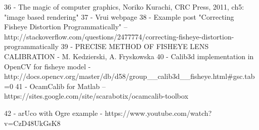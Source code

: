 36 - The magic of computer graphics, Noriko Kurachi, CRC Press, 2011, ch5: "image based rendering"
37 - Vrui webpage
38 - Example post "Correcting Fisheye Distortion Programmatically" -- http://stackoverflow.com/questions/2477774/correcting-fisheye-distortion-programmatically
39 - PRECISE METHOD OF FISHEYE LENS CALIBRATION - M. Kedzierski, A. Fryskowska
40 - Calib3d implementation in OpenCV for fisheye model - http://docs.opencv.org/master/db/d58/group__calib3d__fisheye.html#gsc.tab=0
41 - OcamCalib for Matlab -- https://sites.google.com/site/scarabotix/ocamcalib-toolbox

42 - arUco with Ogre example - https://www.youtube.com/watch?v=CzD48UkGsK8